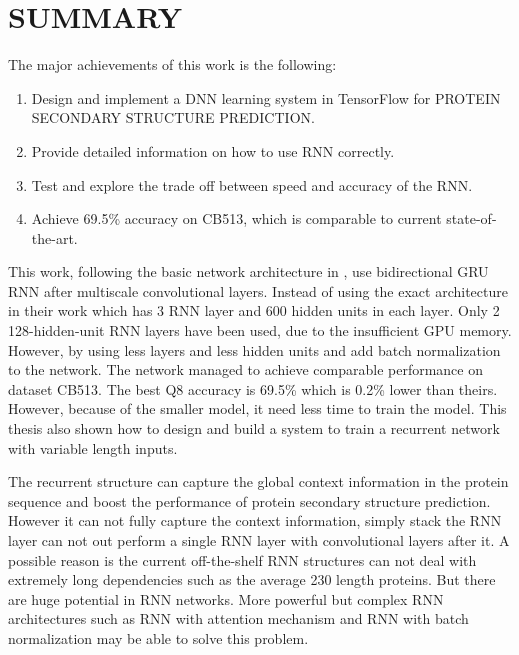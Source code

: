 \chapter{SUMMARY}
	\label{CH_summary}
The major achievements of this work is the following:
\begin{enumerate}
    \item Design and implement a DNN learning system in TensorFlow for PROTEIN SECONDARY STRUCTURE PREDICTION.
    \item Provide detailed information on how to use RNN correctly.
    \item Test and explore the trade off between speed and accuracy of the RNN.
    \item Achieve 69.5\% accuracy on CB513, which is comparable to current state-of-the-art.
\end{enumerate}
This work, following the basic network architecture in \cite{Z.Li2016}, use bidirectional GRU RNN after multiscale convolutional layers. Instead of using the exact architecture in their work which has 3 RNN layer and 600 hidden units in each layer. Only 2 128-hidden-unit RNN layers have been used, due to the insufficient GPU memory. However, by using less layers and less hidden units and add batch normalization to the network. The network managed to achieve comparable performance on dataset CB513. The best Q8 accuracy is 69.5\% which is 0.2\% lower than theirs. However, because of the smaller model, it need less time to train the model. This thesis also shown how to design and build a system to train a recurrent network with variable length inputs.\par

The recurrent structure can capture the global context information in the protein sequence and boost the performance of protein secondary structure prediction. However it can not fully capture the context information, simply stack the RNN layer can not out perform a single RNN layer with convolutional layers after it. A possible reason is the current off-the-shelf RNN structures can not deal with extremely long dependencies such as the average 230 length proteins. But there are huge potential in RNN networks. More powerful but complex RNN architectures such as RNN with attention mechanism\cite{luong2015effective} and RNN with batch normalization\cite{cooijmans2016recurrent} may be able to solve this problem. 